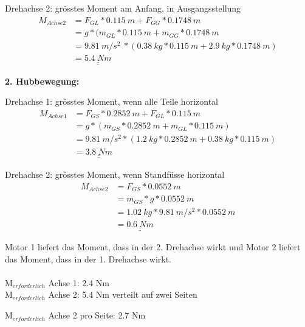 Drehachse 2: grösstes Moment am Anfang, in Ausgangsstellung
\begin{align*}
    M_{Achse 2} &= F_{GL} * 0.115\ m + F_{GG} * 0.1748\ m \\
    &= g * (m_{GL} * 0.115\ m + m_{GG} * 0.1748\ m \\
    &= 9.81\ m/s^2\ * (0.38\ kg * 0.115\ m + 2.9\ kg * 0.1748\ m) \\
    &= \underline{\underline{5.4\ Nm}}
\end{align*}

\textbf{2. Hubbewegung:}

Drehachse 1: grösstes Moment, wenn alle Teile horizontal
\begin{align*}
    M_{Achse 1} &= F_{GS} * 0.2852\ m + F_{GL} * 0.115\ m \\
    &= g * (m_{GS} * 0.2852\ m + m_{GL} * 0.115\ m) \\
    &= 9.81\ m/s^2 * (1.2\ kg * 0.2852\ m + 0.38\ kg * 0.115\ m) \\
    &= \underline{\underline{3.8\ Nm}}
\end{align*}

Drehachse 2: grösstes Moment, wenn Standfüsse horizontal
\begin{align*}
    M_{Achse 2} &= F_{GS} * 0.0552\ m \\
    &= m_{GS} * g * 0.0552\ m \\
    &= 1.02\ kg * 9.81\ m/s^2 * 0.0552\ m \\
    &=\underline{\underline{0.6\ Nm}}
\end{align*}

Motor 1 liefert das Moment, dass in der 2. Drehachse wirkt und Motor 2 liefert das Moment, dass in der 1. Drehachse wirkt.\\
\\
M$_{erforderlich}$ Achse 1: 2.4 Nm\\

M$_{erforderlich}$ Achse 2: 5.4 Nm verteilt auf zwei Seiten

M$_{erforderlich}$ Achse 2 pro Seite: 2.7 Nm
